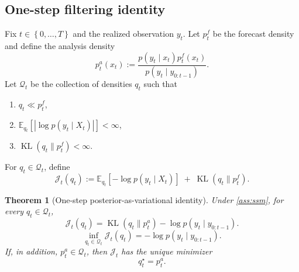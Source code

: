 \documentclass[11pt]{article}
\newcommand{\E}{\mathbb{E}}
\newcommand{\KL}{\operatorname{KL}}
\newcommand{\abs}[1]{\left\lvert #1 \right\rvert}
\newcommand{\set}[1]{\left\{ #1 \right\}}
\newcommand{\bracks}[1]{\left[ #1 \right]}
\newcommand{\mc}{\mathcal}
\numberwithin{equation}{section}
\theoremstyle{plain}
\newtheorem{theorem}{Theorem}[section]
\theoremstyle{definition}
\theoremstyle{remark}
\begin{document}
\subsection{One-step filtering identity}

Fix $t\in\set{0,\dots,T}$ and the realized observation $y_t$. Let $p_t^f$ be the forecast density and define the analysis density
\begin{equation}
p_t^a(x_t)
:=
\frac{p(y_t\mid x_t)p_t^f(x_t)}{p(y_t\mid y_{0:t-1})}.
\label{eq:analysis-density-bayes}
\end{equation}
Let $\mc Q_t$ be the collection of densities $q_t$ such that
\begin{enumerate}[label=\roman*.]
\item $q_t\ll p_t^f$,
\item $\E_{q_t}\!\bracks{\abs{\log p(y_t\mid X_t)}}<\infty$,
\item $\KL(q_t\|p_t^f)<\infty$.
\end{enumerate}
For $q_t\in\mc Q_t$, define
\begin{equation}
\mc J_t(q_t)
:=
\E_{q_t}\!\bracks{-\log p(y_t\mid X_t)}
\;+\;
\KL(q_t\|p_t^f).
\label{eq:one-step-functional}
\end{equation}

\begin{theorem}[One-step posterior-as-variational identity]
\label{thm:one-step-variational}
Under \cref{ass:ssm}, for every $q_t\in\mc Q_t$,
\begin{equation}
\mc J_t(q_t)
=
\KL(q_t\|p_t^a)-\log p(y_t\mid y_{0:t-1}).
\label{eq:one-step-identity}
\end{equation}
\begin{equation}
\inf_{q_t\in\mc Q_t}\mc J_t(q_t)
=
-\log p(y_t\mid y_{0:t-1}).
\label{eq:one-step-infimum}
\end{equation}
If, in addition, $p_t^a\in\mc Q_t$, then $\mc J_t$ has the unique minimizer
\begin{equation}
q_t^\star = p_t^a.
\end{equation}
\end{theorem}
\end{document}
